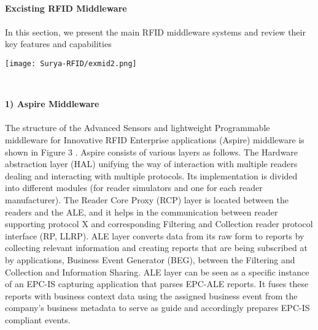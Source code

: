 \documentclass[a4paper,12pt]{article}
\begin{document}
\begin{multicols}{2}
\\

\vfill
\item\textbf{Excisting RFID Middleware}\\


\\
In this section, we present the main RFID middleware
systems and review their key features and capabilities
\pagebreak



\texttt{[image: Surya-RFID/exmid2.png]}

\\

\item \textbf{1) Aspire Middleware	}\\
\\
The structure of the Advanced Sensors and lightweight
Programmable middleware for Innovative RFID Enterprise
applications (Aspire) middleware is shown in Figure 3 .
Aspire consists of various layers as follows. The Hardware
abstraction layer (HAL) unifying the way of interaction with
multiple readers dealing and interacting with multiple
protocols. Its implementation is divided into different
modules (for reader simulators and one for each reader
manufacturer). The Reader Core Proxy (RCP) layer is
located between the readers and the ALE, and it helps in the
communication between reader supporting protocol X and
corresponding Filtering and Collection reader protocol
interface (RP, LLRP). ALE layer converts data from its raw
form to reports by collecting relevant information and
creating reports that are being subscribed at by applications,
Business Event Generator (BEG), between the Filtering and
Collection and Information Sharing. ALE layer can be seen
as a specific instance of an EPC-IS capturing application that
parses EPC-ALE reports. It fuses these reports with business
context data using the assigned business event from the
company’s business metadata to serve as guide and
accordingly prepares EPC-IS compliant events.
\\

\\
\vspace{89mm} %


\end{multicols}
\end{document}
